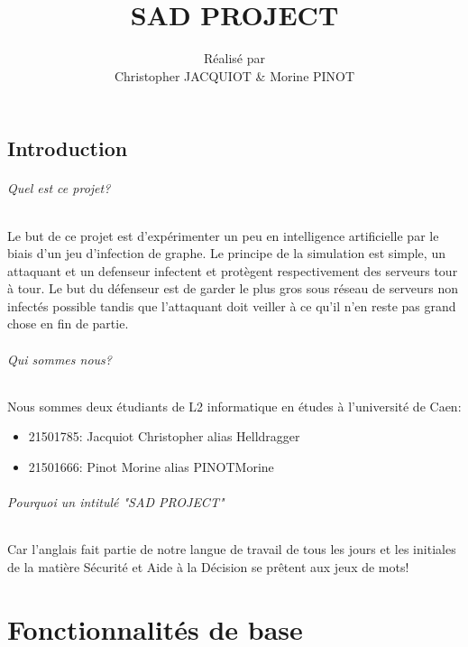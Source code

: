 \documentclass{scrreprt}
\title{\Huge \bfseries SAD PROJECT}
\author{Réalisé par \\Christopher JACQUIOT \& Morine PINOT}
\date{}
\begin{document}
    \maketitle
    \tableofcontents

    \chapter{Introduction}

    \paragraph{Quel est ce projet?}
    Le but de ce projet est d'expérimenter un peu en intelligence artificielle
    par le biais d'un jeu d'infection de graphe.
    Le principe de la simulation est simple, un attaquant et un defenseur
    infectent et protègent respectivement des serveurs tour à tour.
    Le but du défenseur est de garder le plus gros sous réseau de serveurs
    non infectés possible tandis que l'attaquant doit veiller à ce qu'il n'en
    reste pas grand chose en fin de partie.


    \paragraph{Qui sommes nous?}
    Nous sommes deux étudiants de L2 informatique en études à l'université de
    Caen:\\


    \begin{itemize}
        \item 21501785: Jacquiot Christopher alias Helldragger
        \item 21501666: Pinot Morine alias PINOTMorine
    \end{itemize}

    \paragraph{Pourquoi un intitulé "SAD PROJECT"}
    Car l'anglais fait partie de notre langue de travail de tous les jours et
    les initiales de la matière Sécurité et Aide à la Décision se prêtent aux
    jeux de mots!

    \part{Fonctionnalités de base}

\end{document}
